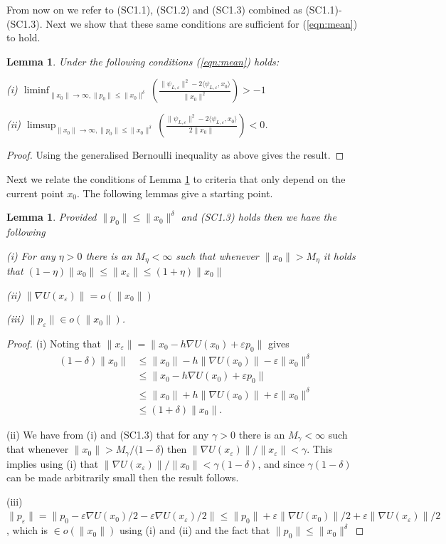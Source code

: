 \documentclass[bj,numbers,noshowframe]{imsart}
\newcommand{\e}{\varepsilon}
\theoremstyle{definition}
\theoremstyle{plain}
\newtheorem{lem}[defn]{Lemma}
\theoremstyle{definition}
\begin{document}
From now on we refer to (SC1.1), (SC1.2) and (SC1.3) combined as (SC1.1)-(SC1.3).
Next we show that these same conditions are sufficient
for (\ref{eqn:mean}) to hold.
\begin{lem}
\label{lem:sufficient_L>1}Under the following conditions (\ref{eqn:mean}) holds:
\vspace{0.3cm}

(i) $\liminf_{\|x_{0}\|\to\infty,\|p_{0}\|\leq\|x_{0}\|^{\delta}}\left(\frac{\|\psi_{L,\e}\|^{2}-2\langle\psi_{L,\e},x_{0}\rangle}{\|x_{0}\|^{2}}\right)>-1$
\vspace{0.3cm}

(ii) $\limsup_{\|x_{0}\|\to\infty,\|p_{0}\|\leq\|x_{0}\|^{\delta}}\left(\frac{\|\psi_{L,\e}\|^{2}-2\langle\psi_{L,\e},x_{0}\rangle}{2\|x_{0}\|}\right)<0$.
\end{lem}
\begin{proof}
Using the generalised Bernoulli inequality as above gives the result.
\end{proof}
Next we relate the conditions of Lemma \ref{lem:sufficient_L>1} to
criteria that only depend on the current
point $x_{0}$. The following lemmas give a starting point.
\begin{lem}
\label{lem:U_lem_1}Provided $\|p_{0}\|\leq\|x_{0}\|^{\delta}$ and
(SC1.3) holds then we have the following
\vspace{0.2cm}

(i) For any $\eta>0$ there is an $M_{\eta}<\infty$ such that whenever
$\|x_{0}\|>M_{\eta}$ it holds that $(1-\eta)\|x_{0}\|\leq\|x_{\e}\|\leq(1+\eta)\|x_{0}\|$
\vspace{0.2cm}

(ii) $\|\nabla U(x_{\e})\|=o(\|x_{0}\|)$
\vspace{0.2cm}

(iii) $\|p_{\e}\|\in o(\|x_{0}\|)$.
\end{lem}
\begin{proof}
(i) Noting that $\|x_{\e}\|=\|x_{0}-h\nabla U(x_{0})+\e p_{0}\|$
gives 
\begin{align*}
(1-\delta)\|x_{0}\| &\leq\|x_{0}\|-h\|\nabla U(x_{0})\|-\e\|x_{0}\|^{\delta} \\
&\leq\|x_{0}-h\nabla U(x_{0})+\e p_{0}\| \\
&\leq\|x_{0}\|+h\|\nabla U(x_{0})\|+\e\|x_{0}\|^{\delta} \\
&\leq(1+\delta)\|x_{0}\|.
\end{align*}

(ii) We have from (i) and (SC1.3) that for any $\gamma>0$ there is
an $M_{\gamma}<\infty$ such that whenever $\|x_{0}\|>M_{\gamma}/(1-\delta$)
then $\|\nabla U(x_{\e})\|/\|x_{\e}\|<\gamma$. This implies
using (i) that $\|\nabla U(x_{\e})\|/\|x_{0}\|<\gamma(1-\delta)$,
and since $\gamma(1-\delta)$ can be made arbitrarily small then the
result follows.

(iii) $\|p_{\e}\|=\|p_{0}-\e\nabla U(x_{0})/2-\e\nabla U(x_{\e})/2\|\leq\|p_{0}\|+\e\|\nabla U(x_{0})\|/2+\e\|\nabla U(x_{\e})\|/2$,
which is $\in o(\|x_{0}\|)$ using (i) and (ii) and the fact that
$\|p_{0}\|\leq\|x_{0}\|^{\delta}$
\end{proof}
\end{document}
